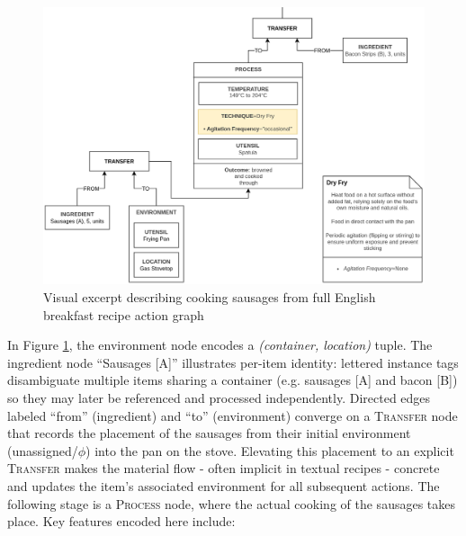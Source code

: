 \documentclass[sigconf]{acmart}
\begin{document}
\begin{figure}[h]
  \centering
  \includegraphics[width=\linewidth]{images/exemplar.png}
  \caption{Visual excerpt describing cooking sausages from full English breakfast recipe action graph}
  \label{fig:exemplar}
\end{figure}

In Figure \ref{fig:exemplar}, the environment node encodes a \emph{(container, location)} tuple. The ingredient node ``Sausages [A]'' illustrates per-item identity: lettered instance tags disambiguate multiple items sharing a container (e.g. sausages [A] and bacon [B]) so they may later be referenced and processed independently. Directed edges labeled ``from'' (ingredient) and ``to'' (environment) converge on a \textsc{Transfer} node that records the placement of the sausages from their initial environment (unassigned/$\phi$) into the pan on the stove. Elevating this placement to an explicit \textsc{Transfer} makes the material flow - often implicit in textual recipes - concrete and updates the item’s associated environment for all subsequent actions. The following stage is a \textsc{Process} node, where the actual cooking of the sausages takes place. Key features encoded here include:
\end{document}
